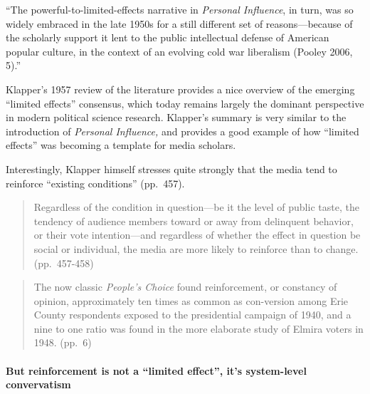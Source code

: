 \documentclass[12pt,book]{article}
\begin{document}
``The powerful-to-limited-effects narrative in \emph{Personal
Influence}, in turn, was so widely embraced in the late 1950s for a
still different set of reasons---because of the scholarly support it
lent to the public intellectual defense of American popular culture, in
the context of an evolving cold war liberalism (Pooley 2006, 5).''

Klapper's 1957 review of the literature provides a nice overview of the
emerging ``limited effects'' consensus, which today remains largely the
dominant perspective in modern political science research. Klapper's
summary is very similar to the introduction of \emph{Personal
Influence,} and provides a good example of how ``limited effects'' was
becoming a template for media scholars.

Interestingly, Klapper himself stresses quite strongly that the media
tend to reinforce ``existing conditions'' (pp.~457).

\begin{quote}
Regardless of the condition in question---be it the level of public
taste, the tendency of audience members toward or away from delinquent
behavior, or their vote intention---and regardless of whether the effect
in question be social or individual, the media are more likely to
reinforce than to change. (pp.~457-458)
\end{quote}

\begin{quote}
The now classic \emph{People's Choice} found reinforcement, or constancy
of opinion, approximately ten times as common as con-version among Erie
County respondents exposed to the presidential campaign of 1940, and a
nine to one ratio was found in the more elaborate study of Elmira voters
in 1948. (pp.~6)
\end{quote}

\paragraph{But reinforcement is not a ``limited effect'', it's
system-level
convervatism}\label{but-reinforcement-is-not-a-limited-effect-its-system-level-convervatism}
\end{document}
